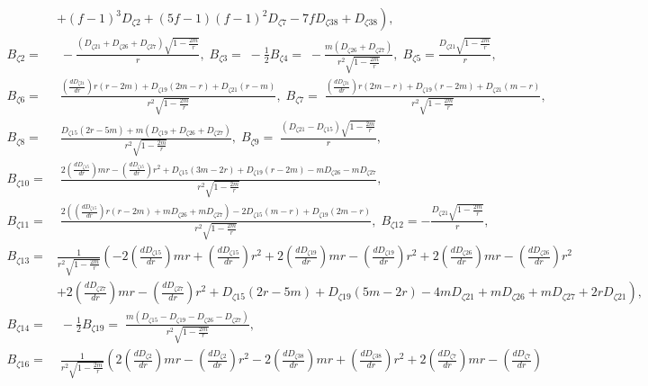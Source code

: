 \documentclass[10pt,twocolumn,preprintnumbers,amsmath,amssymb,nofootinbib
,superscriptaddress]{revtex4-1}
\begin{document}
{{{\begin{widetext}
\begin{align}
 &\left.+(f-1)^3
 D_{\zeta2}+(5 f-1) (f-1)^2 D_{\zeta7}-7 f
 D_{\zeta38}+D_{\zeta38}\right),\nonumber\\
 B_{\zeta2}=&\;-\frac{(D_{\zeta21}+D_{\zeta26}+D_{\zeta27}) \sqrt{1-\frac{2 m}{r}}}{r}, \; B_{\zeta3}=\;-\frac{1}{2}B_{\zeta4}=\;-\frac{m (D_{\zeta26}+D_{\zeta27})}{r^2 \sqrt{1-\frac{2 m}{r}}}, \; B_{\zeta5}=\frac{D_{\zeta21} \sqrt{1-\frac{2 m}{r}}}{r}, \nonumber\\
 B_{\zeta6}=&\;\frac{\left(\frac{dD_{\zeta21}}{dr}\right) r (r-2 m)+D_{\zeta19} (2 m-r)+D_{\zeta21}
 (r-m)}{r^2 \sqrt{1-\frac{2 m}{r}}}, \; B_{\zeta7}=\;\frac{\left(\frac{dD_{\zeta21}}{dr}\right) r (2 m-r)+D_{\zeta19} (r-2 m)+D_{\zeta21}
 (m-r)}{r^2 \sqrt{1-\frac{2 m}{r}}}, \nonumber\\
 B_{\zeta8}=&\;\frac{D_{\zeta15} (2 r-5 m)+m
 (D_{\zeta19}+D_{\zeta26}+D_{\zeta27})}{r^2 \sqrt{1-\frac{2 m}{r}}}, \; B_{\zeta9}=\;\frac{(D_{\zeta21}-D_{\zeta15}) \sqrt{1-\frac{2 m}{r}}}{r}, \nonumber\\
 B_{\zeta10}=&\;\frac{2 \left(\frac{dD_{\zeta15}}{dr}\right) m r-\left(\frac{dD_{\zeta15}}{dr}\right) r^2+D_{\zeta15} (3 m-2
 r)+D_{\zeta19} (r-2 m)-m D_{\zeta26}-m
 D_{\zeta27}}{r^2 \sqrt{1-\frac{2 m}{r}}},\nonumber\\
 B_{\zeta11}=&\;\frac{2 (\left(\frac{dD_{\zeta15}}{dr}\right) r (r-2 m)+m D_{\zeta26}+m D_{\zeta27})-2 D_{\zeta15}
 (m-r)+D_{\zeta19} (2 m-r)}{r^2 \sqrt{1-\frac{2 m}{r}}}, \; B_{\zeta12}=-\frac{D_{\zeta21} \sqrt{1-\frac{2 m}{r}}}{r}, \nonumber\\
 B_{\zeta13}=&\frac{1}{r^2 \sqrt{1-\frac{2 m}{r}}}\left(-2 \left(\frac{dD_{\zeta15}}{dr}\right) m r+\left(\frac{dD_{\zeta15}}{dr}\right) r^2+2 \left(\frac{dD_{\zeta19}}{dr}\right) m r-\left(\frac{dD_{\zeta19}}{dr}\right) r^2+2 \left(\frac{dD_{\zeta26}}{dr}\right) m r-\left(\frac{dD_{\zeta26}}{dr}\right)
 r^2\right.\nonumber\\
 &\left.+2 \left(\frac{dD_{\zeta27}}{dr}\right) m r-\left(\frac{dD_{\zeta27}}{dr}\right) r^2+D_{\zeta15} (2 r-5 m)+D_{\zeta19} (5 m-2 r)-4
 m D_{\zeta21}+m D_{\zeta26}+m D_{\zeta27}+2 r
 D_{\zeta21}\right),\nonumber\\
 B_{\zeta14}=&\;-\frac{1}{2}B_{\zeta19}=\;\frac{m (D_{\zeta15}-D_{\zeta19}-D_{\zeta26}-D_{\zeta27})}{r^2
 \sqrt{1-\frac{2 m}{r}}},\nonumber\\
 B_{\zeta16}=&\;\frac{1}{r^2 \sqrt{1-\frac{2 m}{r}}}\left(2 \left(\frac{dD_{\zeta2}}{dr}\right) m r-\left(\frac{dD_{\zeta2}}{dr}\right) r^2-2 \left(\frac{dD_{\zeta38}}{dr}\right) m r+\left(\frac{dD_{\zeta38}}{dr}\right) r^2+2 \left(\frac{dD_{\zeta7}}{dr}\right) m r-\left(\frac{dD_{\zeta7}}{dr}\right)

\end{align}
\end{widetext}}}}
\end{document}
